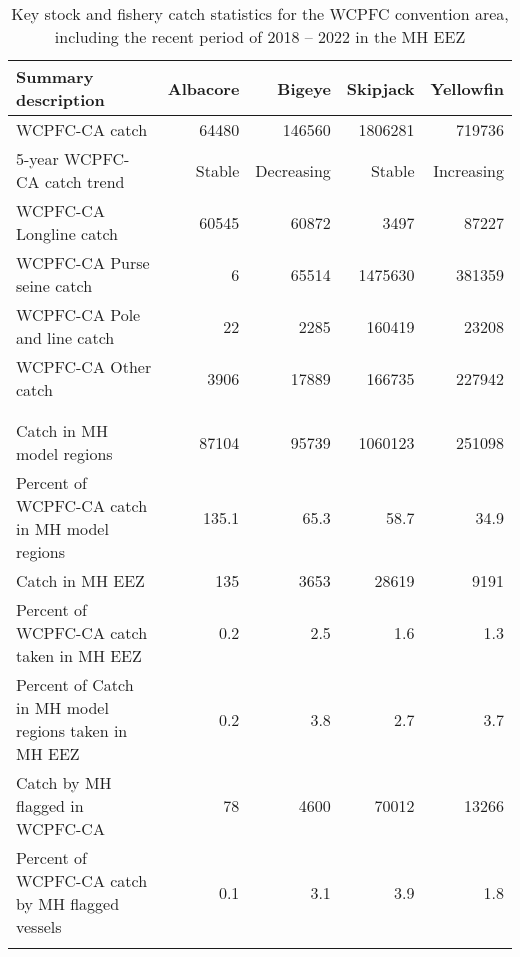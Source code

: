 \begin{longtable}{lrrrr}
\caption{Key stock and fishery catch statistics for the WCPFC convention area, including the recent period of 2018 -- 2022 in the MH EEZ} \\ 
  \hline
Summary description & Albacore & Bigeye & Skipjack & Yellowfin \\ 
  \hline
WCPFC-CA catch & 64480 & 146560 & 1806281 & 719736 \\ 
  5-year WCPFC-CA catch trend & Stable & Decreasing & Stable & Increasing \\ 
  WCPFC-CA Longline catch & 60545 & 60872 & 3497 & 87227 \\ 
  WCPFC-CA Purse seine catch & 6 & 65514 & 1475630 & 381359 \\ 
  WCPFC-CA Pole and line catch & 22 & 2285 & 160419 & 23208 \\ 
  WCPFC-CA Other catch & 3906 & 17889 & 166735 & 227942 \\ 
   &  &  &  &  \\ 
   &  &  &  &  \\ 
   \hline
Catch in MH model regions & 87104 & 95739 & 1060123 & 251098 \\ 
  Percent of WCPFC-CA catch in MH model regions & 135.1 & 65.3 & 58.7 & 34.9 \\ 
  Catch in MH EEZ & 135 & 3653 & 28619 & 9191 \\ 
  Percent of WCPFC-CA catch taken in MH EEZ & 0.2 & 2.5 & 1.6 & 1.3 \\ 
  Percent of Catch in MH model regions taken in MH EEZ & 0.2 & 3.8 & 2.7 & 3.7 \\ 
  Catch by MH flagged in WCPFC-CA & 78 & 4600 & 70012 & 13266 \\ 
  Percent of WCPFC-CA catch by MH flagged vessels & 0.1 & 3.1 & 3.9 & 1.8 \\ 
  \hline
\label{cat_sum_tab}
\end{longtable}
